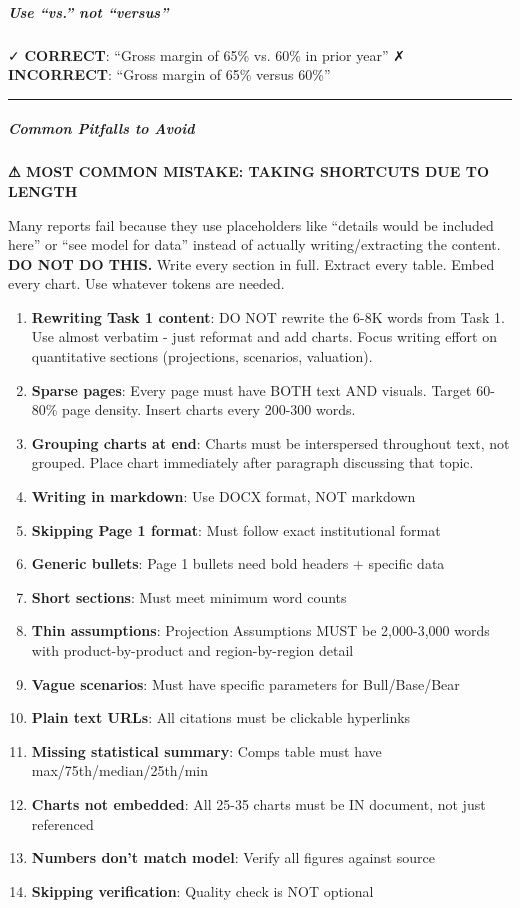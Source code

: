 \documentclass[11pt]{article}
\begin{document}
\subparagraph{Use ``vs.'' not ``versus''}\mbox{}\par
✓ \textbf{CORRECT}: ``Gross margin of 65\% vs. 60\% in prior year'' ✗ \textbf{INCORRECT}: ``Gross margin of 65\% versus 60\%''


\vspace{0.5em}\hrule\vspace{0.5em}

\subparagraph{Common Pitfalls to Avoid}\mbox{}\par

\textbf{⚠ MOST COMMON MISTAKE: TAKING SHORTCUTS DUE TO LENGTH}


Many reports fail because they use placeholders like ``details would be included here'' or ``see model for data'' instead of actually writing/extracting the content. \textbf{DO NOT DO THIS.} Write every section in full. Extract every table. Embed every chart. Use whatever tokens are needed.


\begin{enumerate}[leftmargin=*,itemsep=2pt,topsep=2pt]
\item {} \textbf{Rewriting Task 1 content}: DO NOT rewrite the 6-8K words from Task 1. Use almost verbatim - just reformat and add charts. Focus writing effort on quantitative sections (projections, scenarios, valuation).
\item {} \textbf{Sparse pages}: Every page must have BOTH text AND visuals. Target 60-80\% page density. Insert charts every 200-300 words.
\item {} \textbf{Grouping charts at end}: Charts must be interspersed throughout text, not grouped. Place chart immediately after paragraph discussing that topic.
\item {} \textbf{Writing in markdown}: Use DOCX format, NOT markdown
\item {} \textbf{Skipping Page 1 format}: Must follow exact institutional format
\item {} \textbf{Generic bullets}: Page 1 bullets need bold headers + specific data
\item {} \textbf{Short sections}: Must meet minimum word counts
\item {} \textbf{Thin assumptions}: Projection Assumptions MUST be 2,000-3,000 words with product-by-product and region-by-region detail
\item {} \textbf{Vague scenarios}: Must have specific parameters for Bull/Base/Bear
\item {} \textbf{Plain text URLs}: All citations must be clickable hyperlinks
\item {} \textbf{Missing statistical summary}: Comps table must have max/75th/median/25th/min
\item {} \textbf{Charts not embedded}: All 25-35 charts must be IN document, not just referenced
\item {} \textbf{Numbers don't match model}: Verify all figures against source
\item {} \textbf{Skipping verification}: Quality check is NOT optional
\end{enumerate}
\end{document}
